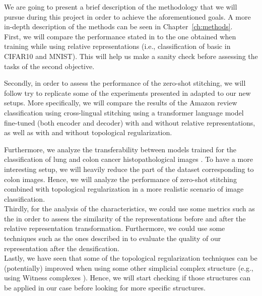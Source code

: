 \documentclass[../main.tex]{subfiles}
\begin{document}
We are going to present a brief description of the methodology that we will pursue during this project in order to achieve the aforementioned goals. A more in-depth description of the methods can be seen in Chapter~\ref{ch:methods}.\\

First, we will compare the performance stated in \cite{hofer_densified_2021} to the one obtained when training while using relative representations (i.e., classification of basic  in CIFAR10 and MNIST). This will help us make a sanity check before assessing the tasks of the second objective.

Secondly, in order to assess the performance of the zero-shot stitching, we will follow try to replicate some of the experiments presented in \cite{moschella_relative_2022} adapted to our new setups. More specifically, we will compare the results of the Amazon review classification using cross-lingual stitching using a transformer language model fine-tuned (both encoder and decoder) with and without relative representations, as well as with and without topological regularization. 

Furthermore, we analyze the transferability between  models \cite{dosovitskiy_vit_2021} trained for the classification of lung and colon cancer histopathological images \cite{borkowski_lung_2019}. To have a more interesting setup, we will heavily reduce the part of the dataset corresponding to colon images. Hence, we will analyze the performance of zero-shot stitching combined with topological regularization in a more realistic scenario of image classification.\\

Thirdly, for the analysis of the characteristics, we could use some metrics such as the   \cite{kornblith_similarity_2019} in order to assess the similarity of the representations before and after the relative representation transformation. Furthermore, we could use some techniques such as the ones described in \cite{poklukar_learning_2022} to evaluate the quality of our representation after the densification.\\

Lastly, we have seen that some of the topological regularization techniques can be (potentially) improved when using some other simplicial complex structure (e.g., using Witness complexes \cite{schonenberger_witness_2022}). Hence, we will start checking if those structures can be applied in our case before looking for more specific structures.
\end{document}
